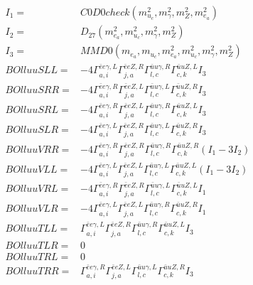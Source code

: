 \documentclass[A4,landscape]{article}
\begin{document}
\begin{align} 
I_1 = & C0D0check(m^2_{u_{{c}}}, m^2_{\gamma}, m^2_{Z}, m^2_{e_{{a}}}) \\ 
I_2 = & D_{27}(m^2_{e_{{a}}}, m^2_{u_{{c}}}, m^2_{\gamma}, m^2_{Z}) \\ 
I_3 = & MMD0(m_{e_{{a}}}, m_{u_{{c}}}, m^2_{e_{{a}}}, m^2_{u_{{c}}}, m^2_{\gamma}, m^2_{Z}) \\ 
  BOlluuSLL= & -4  \Gamma^{\bar{e}e \gamma ,L}_{a, i} \Gamma^{\bar{e}e Z ,R}_{j, a} \Gamma^{\bar{u}u \gamma ,R}_{l, c} \Gamma^{\bar{u}u Z ,L}_{c, k} I_3 \\ 
  BOlluuSRR= & -4  \Gamma^{\bar{e}e \gamma ,R}_{a, i} \Gamma^{\bar{e}e Z ,L}_{j, a} \Gamma^{\bar{u}u \gamma ,L}_{l, c} \Gamma^{\bar{u}u Z ,R}_{c, k} I_3 \\ 
  BOlluuSRL= & -4  \Gamma^{\bar{e}e \gamma ,R}_{a, i} \Gamma^{\bar{e}e Z ,L}_{j, a} \Gamma^{\bar{u}u \gamma ,R}_{l, c} \Gamma^{\bar{u}u Z ,L}_{c, k} I_3 \\ 
  BOlluuSLR= & -4  \Gamma^{\bar{e}e \gamma ,L}_{a, i} \Gamma^{\bar{e}e Z ,R}_{j, a} \Gamma^{\bar{u}u \gamma ,L}_{l, c} \Gamma^{\bar{u}u Z ,R}_{c, k} I_3 \\ 
  BOlluuVRR= & -4  \Gamma^{\bar{e}e \gamma ,R}_{a, i} \Gamma^{\bar{e}e Z ,R}_{j, a} \Gamma^{\bar{u}u \gamma ,R}_{l, c} \Gamma^{\bar{u}u Z ,R}_{c, k} (I_1 - 3 I_2) \\ 
  BOlluuVLL= & -4  \Gamma^{\bar{e}e \gamma ,L}_{a, i} \Gamma^{\bar{e}e Z ,L}_{j, a} \Gamma^{\bar{u}u \gamma ,L}_{l, c} \Gamma^{\bar{u}u Z ,L}_{c, k} (I_1 - 3 I_2) \\ 
  BOlluuVRL= & -4  \Gamma^{\bar{e}e \gamma ,R}_{a, i} \Gamma^{\bar{e}e Z ,R}_{j, a} \Gamma^{\bar{u}u \gamma ,L}_{l, c} \Gamma^{\bar{u}u Z ,L}_{c, k} I_1 \\ 
  BOlluuVLR= & -4  \Gamma^{\bar{e}e \gamma ,L}_{a, i} \Gamma^{\bar{e}e Z ,L}_{j, a} \Gamma^{\bar{u}u \gamma ,R}_{l, c} \Gamma^{\bar{u}u Z ,R}_{c, k} I_1 \\ 
  BOlluuTLL= &  \Gamma^{\bar{e}e \gamma ,L}_{a, i} \Gamma^{\bar{e}e Z ,R}_{j, a} \Gamma^{\bar{u}u \gamma ,R}_{l, c} \Gamma^{\bar{u}u Z ,L}_{c, k} I_3 \\ 
  BOlluuTLR= & 0 \\ 
  BOlluuTRL= & 0 \\ 
  BOlluuTRR= &  \Gamma^{\bar{e}e \gamma ,R}_{a, i} \Gamma^{\bar{e}e Z ,L}_{j, a} \Gamma^{\bar{u}u \gamma ,L}_{l, c} \Gamma^{\bar{u}u Z ,R}_{c, k} I_3 \\ 
\end{align} 
\end{document}
